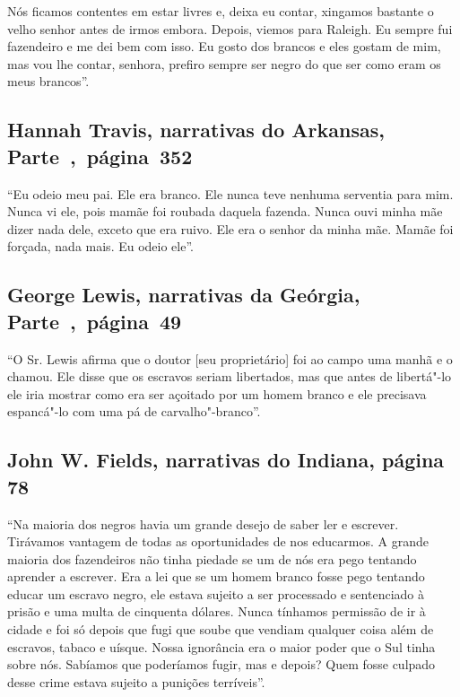 Nós ficamos contentes em estar livres e, deixa eu contar, xingamos
bastante o velho senhor antes de irmos embora. Depois, viemos para
Raleigh. Eu sempre fui fazendeiro e me dei bem com isso. Eu gosto dos
brancos e eles gostam de mim, mas vou lhe contar, senhora, prefiro
sempre ser negro do que ser como eram os meus brancos''.

\subsection{Hannah Travis, narrativas do Arkansas, Parte~,~página~352}
\label{ref263}

``Eu odeio meu pai. Ele era branco. Ele nunca teve nenhuma serventia
para mim. Nunca vi ele, pois mamãe foi roubada daquela fazenda. Nunca
ouvi minha mãe dizer nada dele, exceto que era ruivo. Ele era o senhor
da minha mãe. Mamãe foi forçada, nada mais. Eu odeio ele''.

\subsection{George Lewis, narrativas da Geórgia, Parte~,~página~49}
\label{ref174}

``O Sr. Lewis afirma que o doutor {[}seu proprietário{]} foi ao campo
uma manhã e o chamou. Ele disse que os escravos seriam libertados, mas
que antes de libertá"-lo ele iria mostrar como era ser açoitado por um
homem branco e ele precisava espancá"-lo com uma pá de carvalho"-branco''.

\subsection{John W. Fields, narrativas do Indiana, página 78} \label{ref91}

``Na maioria dos negros havia um grande desejo de saber ler e escrever.
Tirávamos vantagem de todas as oportunidades de nos educarmos. A grande
maioria dos fazendeiros não tinha piedade se um de nós era pego tentando
aprender a escrever. Era a lei que se um homem branco fosse pego
tentando educar um escravo negro, ele estava sujeito a ser processado e
sentenciado à prisão e uma multa de cinquenta dólares. Nunca tínhamos
permissão de ir à cidade e foi só depois que fugi que soube que vendiam
qualquer coisa além de escravos, tabaco e uísque. Nossa ignorância era o
maior poder que o Sul tinha sobre nós. Sabíamos que poderíamos fugir,
mas e depois? Quem fosse culpado desse crime estava sujeito a punições
terríveis''.

